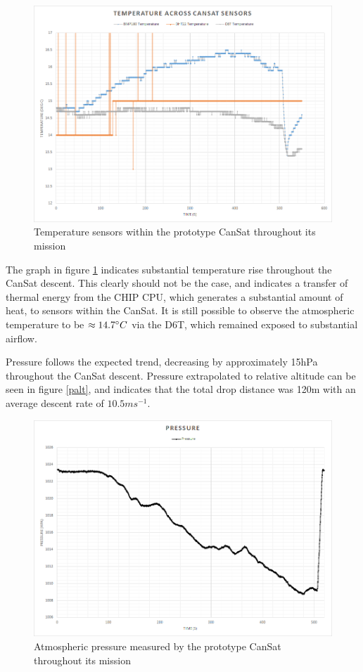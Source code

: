 \documentclass[]{report}
\begin{document}
	\begin{figure}[h]
		\hfill\includegraphics[scale=0.7]{temps.png}\hspace*{\fill}
		\caption{Temperature sensors within the prototype CanSat throughout its mission}
		\label{ptemps}
	\end{figure}
	
	The graph in figure \ref{ptemps} indicates substantial temperature rise throughout the CanSat descent. This clearly should not be the case, and indicates a transfer of thermal energy from the CHIP CPU, which generates a substantial amount of heat, to sensors within the CanSat. It is still possible to observe the atmospheric temperature to be $\approx14.7\degree C$ via the D6T, which remained exposed to substantial airflow.
	
	Pressure follows the expected trend, decreasing by approximately 15hPa throughout the CanSat descent. Pressure extrapolated to relative altitude can be seen in figure \ref{palt}, and indicates that the total drop distance was 120m with an average descent rate of $10.5ms^{-1}$. 

	\begin{figure}[h]
	\hfill\includegraphics[scale=0.7]{pressure.png}\hspace*{\fill}
	\caption{Atmospheric pressure measured by the prototype CanSat throughout its mission}
	\label{ppres}
	\end{figure}
\end{document}
